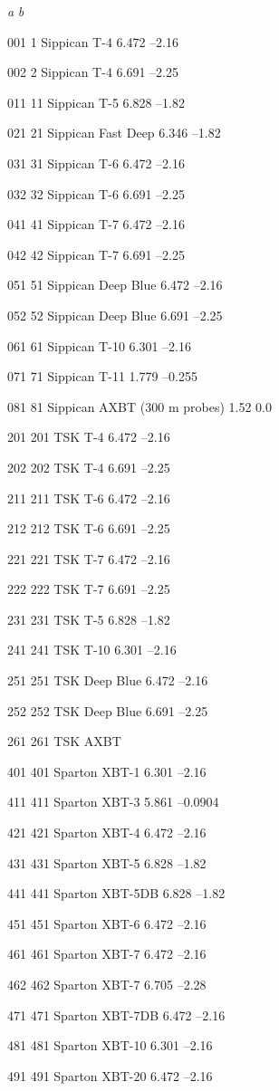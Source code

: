 \emph{a} \emph{b}

001 1 Sippican T-4 6.472 --2.16

002 2 Sippican T-4 6.691 --2.25

011 11 Sippican T-5 6.828 --1.82

021 21 Sippican Fast Deep 6.346 --1.82

031 31 Sippican T-6 6.472 --2.16

032 32 Sippican T-6 6.691 --2.25

041 41 Sippican T-7 6.472 --2.16

042 42 Sippican T-7 6.691 --2.25

051 51 Sippican Deep Blue 6.472 --2.16

052 52 Sippican Deep Blue 6.691 --2.25

061 61 Sippican T-10 6.301 --2.16

071 71 Sippican T-11 1.779 --0.255

081 81 Sippican AXBT (300 m probes) 1.52 0.0

201 201 TSK T-4 6.472 --2.16

202 202 TSK T-4 6.691 --2.25

211 211 TSK T-6 6.472 --2.16

212 212 TSK T-6 6.691 --2.25

221 221 TSK T-7 6.472 --2.16

222 222 TSK T-7 6.691 --2.25

231 231 TSK T-5 6.828 --1.82

241 241 TSK T-10 6.301 --2.16

251 251 TSK Deep Blue 6.472 --2.16

252 252 TSK Deep Blue 6.691 --2.25

261 261 TSK AXBT

401 401 Sparton XBT-1 6.301 --2.16

411 411 Sparton XBT-3 5.861 --0.0904

421 421 Sparton XBT-4 6.472 --2.16

431 431 Sparton XBT-5 6.828 --1.82

441 441 Sparton XBT-5DB 6.828 --1.82

451 451 Sparton XBT-6 6.472 --2.16

461 461 Sparton XBT-7 6.472 --2.16

462 462 Sparton XBT-7 6.705 --2.28

471 471 Sparton XBT-7DB 6.472 --2.16

481 481 Sparton XBT-10 6.301 --2.16

491 491 Sparton XBT-20 6.472 --2.16

